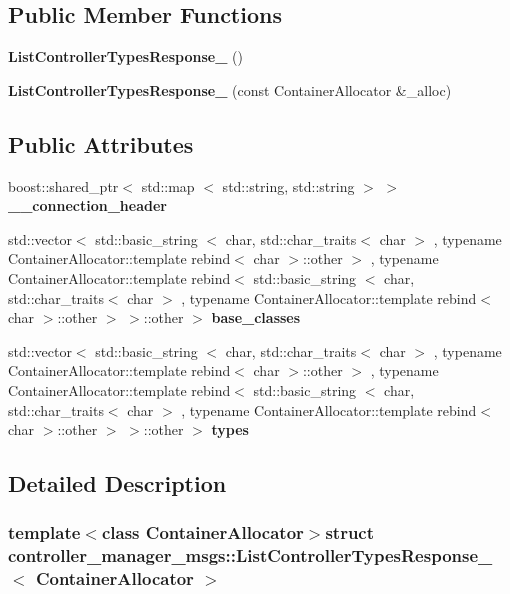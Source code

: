 \subsection*{\-Public \-Member \-Functions}
\begin{DoxyCompactItemize}
\item 
{\bf \-List\-Controller\-Types\-Response\-\_\-} ()
\item 
{\bf \-List\-Controller\-Types\-Response\-\_\-} (const \-Container\-Allocator \&\-\_\-alloc)
\end{DoxyCompactItemize}
\subsection*{\-Public \-Attributes}
\begin{DoxyCompactItemize}
\item 
boost\-::shared\-\_\-ptr$<$ std\-::map\*
$<$ std\-::string, std\-::string $>$ $>$ {\bf \-\_\-\-\_\-connection\-\_\-header}
\item 
std\-::vector$<$ std\-::basic\-\_\-string\*
$<$ char, std\-::char\-\_\-traits$<$ char $>$\*
, typename \*
\-Container\-Allocator\-::template \*
rebind$<$ char $>$\-::other $>$\*
, typename \*
\-Container\-Allocator\-::template \*
rebind$<$ std\-::basic\-\_\-string\*
$<$ char, std\-::char\-\_\-traits$<$ char $>$\*
, typename \*
\-Container\-Allocator\-::template \*
rebind$<$ char $>$\-::other $>$\*
 $>$\-::other $>$ {\bf base\-\_\-classes}
\item 
std\-::vector$<$ std\-::basic\-\_\-string\*
$<$ char, std\-::char\-\_\-traits$<$ char $>$\*
, typename \*
\-Container\-Allocator\-::template \*
rebind$<$ char $>$\-::other $>$\*
, typename \*
\-Container\-Allocator\-::template \*
rebind$<$ std\-::basic\-\_\-string\*
$<$ char, std\-::char\-\_\-traits$<$ char $>$\*
, typename \*
\-Container\-Allocator\-::template \*
rebind$<$ char $>$\-::other $>$\*
 $>$\-::other $>$ {\bf types}
\end{DoxyCompactItemize}


\subsection{\-Detailed \-Description}
\subsubsection*{template$<$class Container\-Allocator$>$struct controller\-\_\-manager\-\_\-msgs\-::\-List\-Controller\-Types\-Response\-\_\-$<$ Container\-Allocator $>$}



